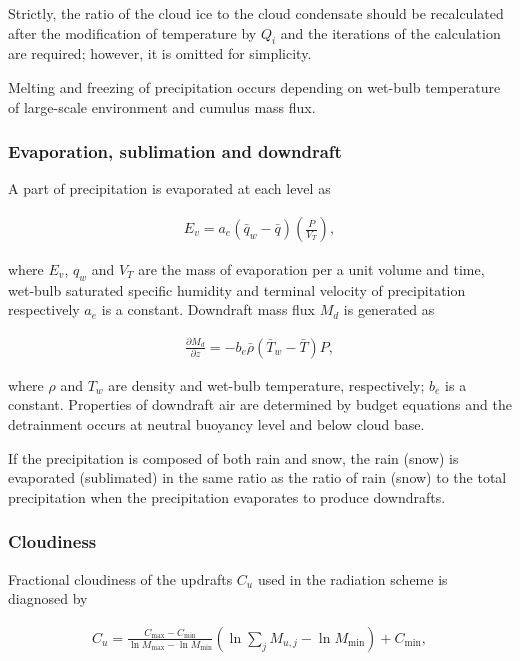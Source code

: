 Strictly, the ratio of the cloud ice to the cloud condensate should be
recalculated after the modification of temperature by \(Q_i\) and the
iterations of the calculation are required; however, it is omitted for
simplicity.

Melting and freezing of precipitation occurs depending on wet-bulb
temperature of large-scale environment and cumulus mass flux.

\hypertarget{evaporation-sublimation-and-downdraft}{%
\subsubsection{Evaporation, sublimation and
downdraft}\label{evaporation-sublimation-and-downdraft}}

A part of precipitation is evaporated at each level as

\begin{eqnarray}
 E_v = a_e (\bar{q}_w - \bar{q}) \left(\frac{P}{V_T}\right),
\end{eqnarray}

where \(E_v\), \(q_w\) and \(V_T\) are the mass of evaporation per a
unit volume and time, wet-bulb saturated specific humidity and terminal
velocity of precipitation respectively \(a_e\) is a constant. Downdraft
mass flux \(M_d\) is generated as

\begin{eqnarray}
 \frac{\partial M_d}{\partial z} = -b_e \bar{\rho} (\bar{T}_w - \bar{T}) P,
\end{eqnarray}

where \(\rho\) and \(T_w\) are density and wet-bulb temperature,
respectively; \(b_e\) is a constant. Properties of downdraft air are
determined by budget equations and the detrainment occurs at neutral
buoyancy level and below cloud base.

If the precipitation is composed of both rain and snow, the rain (snow)
is evaporated (sublimated) in the same ratio as the ratio of rain (snow)
to the total precipitation when the precipitation evaporates to produce
downdrafts.

\hypertarget{cloudiness}{%
\subsubsection{Cloudiness}\label{cloudiness}}

Fractional cloudiness of the updrafts \(C_u\) used in the radiation
scheme is diagnosed by

\begin{eqnarray}
 C_u = \frac{C_\mathrm{max} - C_\mathrm{min}}{\ln M_\mathrm{max} - \ln M_\mathrm{min}}(\ln \sum_j M_{u,j} - \ln M_\mathrm{min}) + C_\mathrm{min},
\end{eqnarray}

